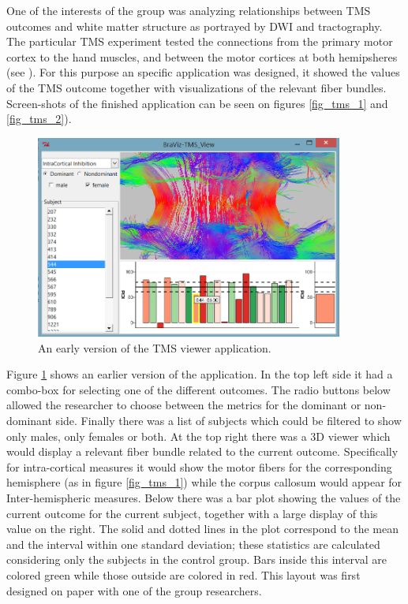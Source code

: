  


One of the interests of the group was analyzing relationships between TMS outcomes and white matter structure as portrayed by DWI and tractography. The particular TMS experiment tested the connections from the primary motor cortex to the hand muscles, and between the motor cortices at both hemipsheres (see \autocite{schneider_cerebral_2012}). For this purpose an specific application was designed, it showed the values of the TMS outcome together with visualizations of the relevant fiber bundles. Screen-shots of the finished application can be seen on figures \ref{fig_tms_1} and \ref{fig_tms_2}). 

\begin{figure}
	\centering
		\includegraphics[width=0.90\textwidth]{figures/analysis/tms_view_early}
	\caption{An early version of the TMS viewer application.}
	\label{fig_tms_view_early}
\end{figure}

Figure \ref{fig_tms_view_early} shows an earlier version of the application. In the top left side it had a combo-box for selecting one of the different outcomes. The radio buttons below allowed the researcher to choose between the metrics for the dominant or non-dominant side. Finally there was a list of subjects which could be filtered to show only males, only females or both. At the top right there was a 3D viewer which would display a relevant fiber bundle related to the current outcome. Specifically for intra-cortical measures it would show the motor fibers for the corresponding hemisphere (as in figure \ref{fig_tms_1}) while the corpus callosum would appear for Inter-hemispheric measures.
Below there was a bar plot showing the values of the current outcome for the current subject, together with a large display of this value on the right. The solid and dotted lines in the plot correspond to the mean and the interval within one standard deviation; these statistics are calculated considering only the subjects in the control group. Bars inside this interval are colored green while those outside are colored in red.
This layout was first designed on paper with one of the group researchers. 

